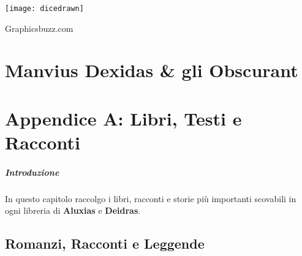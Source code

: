 \documentclass[10pt,twoside,onecolumn,openany]{book}
\begin{document}
\begin{center}
\texttt{[image: dicedrawn]}\\
\begin{tiny}
Graphicsbuzz.com
\end{tiny}
\end{center}
\newpage
\chapter{Manvius Dexidas \& gli Obscurant}
\newpage
\chapter{Appendice A: Libri, Testi e Racconti}
\paragraph{Introduzione} In questo capitolo raccolgo i libri, racconti e storie più importanti scovabili in ogni libreria di \textbf{Aluxias} e \textbf{Deidras}.
\section{Romanzi, Racconti e Leggende}
\end{document}
